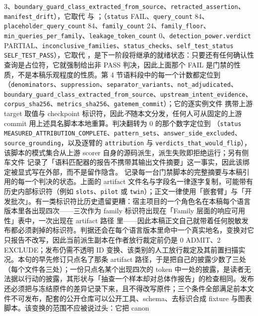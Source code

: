 \documentclass[UTF8,11pt]{ctexart}
\begin{document}
\begin{sloppypar}
3、\texttt{boundary\_guard\_class\_extracted\_from\_source}、\texttt{retracted\_assertion}、\texttt{manifest\_drift}），它取代  与 ；（\texttt{status} FAIL、\texttt{query\_count} 84、\texttt{placeholder\_query\_count} 84、\texttt{family\_count} 24、\texttt{family\_floor}、\texttt{min\_queries\_per\_family}、\texttt{leakage\_token\_count} 0、\texttt{detection\_power.verdict} PARTIAL、\texttt{inconclusive\_families}、\texttt{status\_checks}、\texttt{self\_test\_status} \texttt{SELF\_TEST\_PASS}），它取代 ，是下一阶段将继承的就绪状态：只要还有任何确认性查询是占位符，它就强制给出非 PASS 判决，因此上面那个 FAIL 是门禁的性质，不是本稿乐观程度的性质。第 4 节语料段中的每一个计数都定位到 （\texttt{denominators}、\texttt{suppression}、\texttt{separator\_variants}、\texttt{not\_adjudicated}、\texttt{boundary\_guard\_class\_extracted\_from\_source}、\texttt{upstream\_intent\_evidence}、\texttt{corpus\_sha256}、\texttt{metrics\_sha256}、\texttt{gatemem\_commit}）；它的逐实例文件  携带上游 target 取值与 checkpoint 标识符，因此\emph{不}随本文分发，任何人可从固定的上游 commit 用上述具名脚本本地重算。判决翻转为 0 的那个数字定位到 （\texttt{status} \texttt{MEASURED\_ATTRIBUTION\_COMPLETE}、\texttt{pattern\_sets}、\texttt{answer\_side\_excluded}、\texttt{source\_grounding}，以及逐臂的 \texttt{attribution} 与 \texttt{verdicts\_that\_would\_flip}），该脚本的模式集合从上游 scorer 自身的源码派生，派生失败即拒绝运行；另有侧车文件  记录了「语料匹配器的报告不携带其输出文件摘要」这一事实，因此该绑定被显式写在外部，而不是留作隐含。 记录每一台门禁脚本的完整摘要与本稿引用的每一个判决的状态。上面的 artifact 文件名与字段名一律逐字复制，可能带有历史内部标识符（例如 \texttt{slots}、\texttt{pilot} 或 \texttt{twin}）；正文一律使用「嵌套臂」与「开发批次」。有一类标识符比历史遗留更糟：宿主项目的一个角色名在本稿每个语言版本里各出现四次——三次作为 family 标识符出现在「Family 层面的响应可用性」表中，一次出现在 artifact 路径  里——因此本稿正文自己就带着任何脱敏发布都必须剥掉的标识符。判据还会在每个语言版本里命中一个真实地名，变换对它只报告不改写，因此当前派生副本在作者放行裁定前仍是 0 ADMIT、2 EXCLUDE；发布仍需不透明 ID 变换、该类别的人工放行裁定及其前置扫描实况。本句的早先修订只点名了那条 artifact 路径，于是把自己的披露少数了三处（每个文件各三处）；一份只点名某个出现四次的 token 中一处的披露，是读者无法据以行动的披露，其形状与「抽查一个样本却对总体作报告」的检查相同。发布还必须把与冻结原件的差异记录下来，且不得改写原件；三个条件全部满足前本文件不可发布，配套的公开仓库可以公开工具、schema、去标识合成 fixture 与图表脚本。该变换的范围不应被说过头：它把 canon 
\end{sloppypar}
\end{document}
